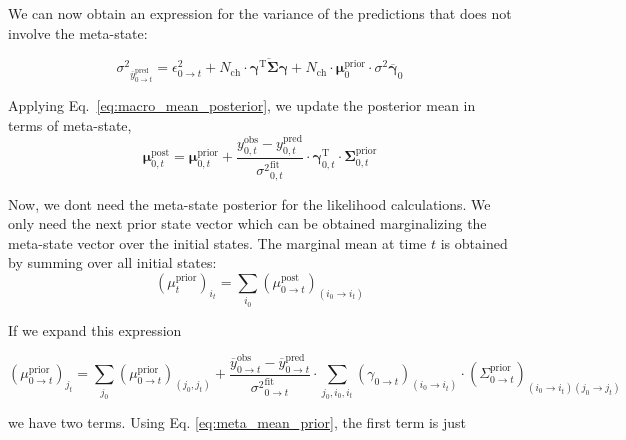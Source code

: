 \documentclass[pdflatex,sn-mathphys-num]{sn-jnl}%
\theoremstyle{thmstyleone}%
\theoremstyle{thmstyletwo}%
\theoremstyle{thmstylethree}%
\begin{document}
We can now obtain an expression for the variance of the predictions that does not involve the meta-state: 

\begin{equation}
	{\sigma^2}_{\overline{y}^{\mathrm{pred}}_{0 \rightarrow t}}
	= \epsilon^2_{0 \rightarrow t} + N_{\mathrm{ch}} \cdot\overline{\mathbf{\gamma}^{\mathrm{T}} \mathbf{\Sigma}\mathbf{\gamma}}
	+ N_{\mathrm{ch}} \cdot \mathbf{\mu}^{\mathrm{prior}}_{0} \cdot {\sigma^2 \overline{\mathbf{\gamma}}}_{0}
	\label{eq:macro_interval_sigma_pred}
\end{equation}



Applying Eq.~\ref{eq:macro_mean_posterior}, we update the posterior mean in terms of meta-state,
\begin{equation}
	\mathbf{\mu}^{\mathrm{post}}_{0, t} = \mathbf{\mu}^{\mathrm{prior}}_{0, t} + 
	\frac{y^{\mathrm{obs}}_{0, t} - y^{\mathrm{pred}}_{0, t}}{{\sigma^2}^{\mathrm{fit}}_{0, t}} 
	\cdot \mathbf{\gamma}^{\mathrm{T}}_{0, t} \cdot \mathbf{\Sigma}^{\mathrm{prior}}_{0, t}
	\label{eq:meta_posterior_mean_update}
\end{equation}

Now, we dont need the meta-state posterior for the likelihood calculations. We only need the next prior state vector which can be obtained marginalizing the meta-state vector over the initial states. The marginal mean at time \( t \) is obtained by summing over all initial states:
\begin{equation}
	(\mu^{\mathrm{prior}}_{t})_{i_t} = \sum_{i_0} (\mu^{\mathrm{post}}_{0 \rightarrow t})_{(i_0 \rightarrow i_t)}
	\label{eq:marginal_prior_mean}
\end{equation}

If we expand this expression

\begin{equation}
	(\mu^{\mathrm{prior}}_{0 \rightarrow t})_{j_{t}} = 
	\sum_{j_0} (\mu^{\mathrm{prior}}_{0 \rightarrow t})_{(j_0, j_{t})} 
	+ \frac{\overline{y}^{\mathrm{obs}}_{0 \rightarrow t} - \overline{y}^{\mathrm{pred}}_{0 \rightarrow t}}{{\sigma^2}^{\mathrm{fit}}_{0 \rightarrow t}} \cdot 
	\sum_{j_0, i_0, i_{t}} (\gamma_{0 \rightarrow t})_{(i_0 \rightarrow i_{t})} \cdot (\Sigma^{\mathrm{prior}}_{0 \rightarrow t})_{(i_0 \rightarrow i_{t})(j_0 \rightarrow j_{t})}
	\label{eq:mu_prior_update_0_to_t}
\end{equation}


we have two terms. Using Eq. \ref{eq:meta_mean_prior}, the first term is just
\end{document}
